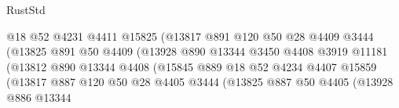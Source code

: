\begin{lexlean}{RustStd}
\begin{coremodule}
                                          @18
                                          @52
                                          @4231
                                          @4411
                                          @15825
                                          (@13817
                                            @891
                                            @120
                                            @50
                                            @28
                                            @4409
                                            @3444
                                            (@13825
                                              @891
                                              @50
                                              @4409
                                              (@13928
                                                @890
                                                @13344
                                                @3450
                                                @4408
                                                @3919
                                                @11181
                                                (@13812
                                                  @890
                                                  @13344
                                                  @4408
                                                  (@15845
                                                    @889
                                                    @18
                                                    @52
                                                    @4234
                                                    @4407
                                                    @15859
                                                    (@13817
                                                      @887
                                                      @120
                                                      @50
                                                      @28
                                                      @4405
                                                      @3444
                                                      (@13825
                                                        @887
                                                        @50
                                                        @4405
                                                        (@13928
                                                          @886
                                                          @13344

\end{coremodule}
\end{lexlean}
